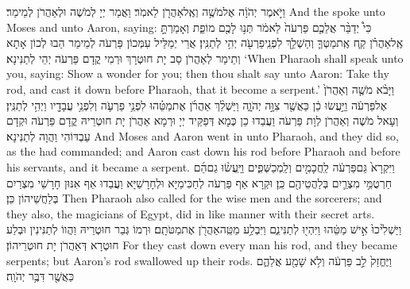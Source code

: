{וַיֹּ֣אמֶר יְהֹוָ֔ה אֶל\maqqaf מֹשֶׁ֥ה וְאֶֽל\maqqaf אַהֲרֹ֖ן לֵאמֹֽר׃}
{וַאֲמַר יְיָ לְמֹשֶׁה וּלְאַהֲרֹן לְמֵימַר׃}
{And the \lord\space spoke unto Moses and unto Aaron, saying:}{}
{כִּי֩ יְדַבֵּ֨ר אֲלֵכֶ֤ם פַּרְעֹה֙ לֵאמֹ֔ר תְּנ֥וּ לָכֶ֖ם מוֹפֵ֑ת וְאָמַרְתָּ֣ אֶֽל\maqqaf אַהֲרֹ֗ן קַ֧ח אֶֽת\maqqaf מַטְּךָ֛ וְהַשְׁלֵ֥ךְ לִפְנֵֽי\maqqaf פַרְעֹ֖ה יְהִ֥י לְתַנִּֽין׃}
{אֲרֵי יְמַלֵּיל עִמְּכוֹן פַּרְעֹה לְמֵימַר הַבוּ לְכוֹן אָתָא וְתֵימַר לְאַהֲרֹן סַב יָת חוּטְרָךְ וּרְמִי קֳדָם פַּרְעֹה יְהֵי לְתַנִּינָא׃}
{‘When Pharaoh shall speak unto you, saying: Show a wonder for you; then thou shalt say unto Aaron: Take thy rod, and cast it down before Pharaoh, that it become a serpent.’}{}
{וַיָּבֹ֨א מֹשֶׁ֤ה וְאַהֲרֹן֙ אֶל\maqqaf פַּרְעֹ֔ה וַיַּ֣עֲשׂוּ כֵ֔ן כַּאֲשֶׁ֖ר צִוָּ֣ה יְהֹוָ֑ה וַיַּשְׁלֵ֨ךְ אַהֲרֹ֜ן אֶת\maqqaf מַטֵּ֗הוּ לִפְנֵ֥י פַרְעֹ֛ה וְלִפְנֵ֥י עֲבָדָ֖יו וַיְהִ֥י לְתַנִּֽין׃}
{וְעָאל מֹשֶׁה וְאַהֲרֹן לְוָת פַּרְעֹה וַעֲבַדוּ כֵן כְּמָא דְּפַקֵּיד יְיָ וּרְמָא אַהֲרֹן יָת חוּטְרֵיהּ קֳדָם פַּרְעֹה וּקְדָם עַבְדּוֹהִי וַהֲוָה לְתַנִּינָא׃}
{And Moses and Aaron went in unto Pharaoh, and they did so, as the \lord\space had commanded; and Aaron cast down his rod before Pharaoh and before his servants, and it became a serpent.}{}
{וַיִּקְרָא֙ גַּם\maqqaf פַּרְעֹ֔ה לַֽחֲכָמִ֖ים וְלַֽמְכַשְּׁפִ֑ים וַיַּֽעֲשׂ֨וּ גַם\maqqaf הֵ֜ם חַרְטֻמֵּ֥י מִצְרַ֛יִם בְּלַהֲטֵיהֶ֖ם כֵּֽן׃}
{וּקְרָא אַף פַּרְעֹה לְחַכִּימַיָּא וּלְחָרָשַׁיָּא וַעֲבַדוּ אַף אִנּוּן חָרָשֵׁי מִצְרַיִם בְּלַחֲשֵׁיהוֹן כֵּן׃}
{Then Pharaoh also called for the wise men and the sorcerers; and they also, the magicians of Egypt, did in like manner with their secret arts.}{}
{וַיַּשְׁלִ֙יכוּ֙ אִ֣ישׁ מַטֵּ֔הוּ וַיִּהְי֖וּ לְתַנִּינִ֑ם וַיִּבְלַ֥ע מַטֵּֽה\maqqaf אַהֲרֹ֖ן אֶת\maqqaf מַטֹּתָֽם׃}
{וּרְמוֹ גְּבַר חוּטְרֵיהּ וַהֲווֹ לְתַנִּינִין וּבְלַע חוּטְרָא דְּאַהֲרֹן יָת חוּטְרֵיהוֹן׃}
{For they cast down every man his rod, and they became serpents; but Aaron’s rod swallowed up their rods.}{}
{וַיֶּחֱזַק֙ לֵ֣ב פַּרְעֹ֔ה וְלֹ֥א שָׁמַ֖ע אֲלֵהֶ֑ם כַּאֲשֶׁ֖ר דִּבֶּ֥ר יְהֹוָֽה׃ \setuma }
